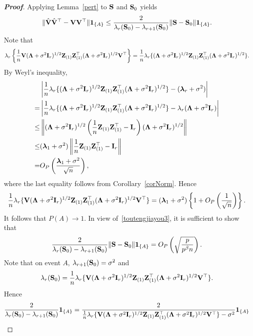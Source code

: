 \documentclass[times,sort&compress,3p]{elsarticle}
\newcommand{\bZ}{\mathbf{Z}}
\newcommand{\bfsym}[1]{\ensuremath{\boldsymbol{#1}}}
\def\blambda {\bfsym {\lambda}}        \def\bLambda {\bfsym {\Lambda}}
\theoremstyle{plain}
\theoremstyle{definition}
\theoremstyle{remark}
\begin{document}
\begin{appendices}
\begin{proof}[\textbf{Proof}]
    Applying Lemma~\ref{pert} to $\mathbf{S}$ and $\mathbf{S}_0$ yields
    \begin{equation}\label{toutengjiayou3}
    \|\hat{\mathbf{V}}\hat{\mathbf{V}}^\top - \mathbf{V}\mathbf{V} ^\top\| \mathbf{1}_{\{A\}}\leq
        \frac{2}{\lambda_r(\mathbf{S}_0)-\lambda_{r+1}(\mathbf{S}_0)}\|\mathbf{S}-\mathbf{S}_0\|\mathbf{1}_{\{A\}}.
    \end{equation}
    Note that
$$
\lambda_r\left\{\frac{1}{n}\BV(\bLambda+\sigma^2\BI_r)^{1/2}\bZ_{(1)} \bZ_{(1)}^\top(\bLambda+\sigma^2\BI_r)^{1/2}\BV^\top\right\}
    =
    \frac{1}{n}\lambda_r\{(\bLambda+\sigma^2\BI_r)^{1/2}\bZ_{(1)} \bZ_{(1)}^\top(\bLambda+\sigma^2\BI_r)^{1/2}\}.
$$
By Weyl's inequality,
\begin{align*}
    &\left|
    \frac{1}{n}\lambda_r\{(\bLambda+\sigma^2 \BI_r)^{1/2}\bZ_{(1)} \bZ_{(1)}^\top(\bLambda+\sigma^2 \BI_r)^{1/2}\}
-
    (\blambda_r+\sigma^2)
\right|\\
    =&\left|
\frac{1}{n}\lambda_r\{(\bLambda+\sigma^2 \BI_r)^{1/2}\bZ_{(1)} \bZ_{(1)}^\top(\bLambda+\sigma^2 \BI_r)^{1/2}\}
-
\lambda_r(\bLambda+\sigma^2\BI_r)
\right|
    \\
    \leq&
    \left\|(\bLambda+\sigma^2\BI_r)^{1/2}\left(\frac{1}{n}\bZ_{(1)} \bZ_{(1)}^\top-\BI_r\right)(\bLambda+\sigma^2\BI_r)^{1/2}\right\|\\
    \leq& (\blambda_1+\sigma^2)\left\|\frac{1}{n}\bZ_{(1)} \bZ_{(1)}^\top-\BI_r\right\|
    \\
    =& O_P\left(\frac{\blambda_1+\sigma^2}{\sqrt{n}}\right),
\end{align*}
    where the last equality follows from Corollary~\ref{corNorm}.
    Hence
$$
\frac{1}{n}\lambda_r\{\BV(\bLambda+\sigma^2 \BI_r)^{1/2}\bZ_{(1)} \bZ_{(1)}^\top(\bLambda+\sigma^2 \BI_r)^{1/2}\BV^\top\}
=(\blambda_1+\sigma^2)\left\{1+O_P\left(\frac{1}{\sqrt{n}}\right)\right\}.
        $$
        It follows that $P(A)\to 1$.
        In view of~\eqref{toutengjiayou3}, it is sufficient to show that
        $$
        \frac{2}{\lambda_r(\mathbf{S}_0)-\lambda_{r+1}(\mathbf{S}_0)}\|\mathbf{S}-\mathbf{S}_0\|\mathbf{1}_{\{A\}}=O_P\left(\sqrt{\frac{p}{p^{\beta}n }}\right).
        $$
        Note that on event $A$, $\lambda_{r+1}(\mathbf{S}_0)=\sigma^2$ and
        $$\lambda_r(\BS_0)=\frac{1}{n}\lambda_r\{\BV(\bLambda+\sigma^2 \BI_r)^{1/2}\bZ_{(1)} \bZ_{(1)}^\top (\bLambda+\sigma^2 \BI_r)^{1/2}\BV^\top \}.$$
        Hence
\begin{align*}
    &\frac{2}{\lambda_r(\BS_0)-\lambda_{r+1}(\BS_0)}\mathbf{1}_{\{A\}}
    =
    \frac{2}{
    \frac{1}{n}\lambda_r\{\BV(\bLambda+\sigma^2 \BI_r)^{1/2}\bZ_{(1)} \bZ_{(1)}^\top (\bLambda+\sigma^2 \BI_r)^{1/2}\BV^\top \}-\sigma^2}\mathbf{1}_{\{A\}}\\

\end{align*}
\end{proof}
\end{appendices}
\end{document}
